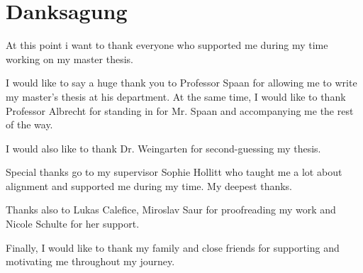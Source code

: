 \chapter*{Danksagung}

At this point i want to thank everyone who supported me during my time working
on my master thesis.

I would like to say a huge thank you to Professor Spaan for allowing me to write my master's thesis at his department. At the same time, I would like to thank Professor Albrecht for standing in for Mr. Spaan and accompanying me the rest of the way.

I would also like to thank Dr. Weingarten for second-guessing my thesis.

Special thanks go to my supervisor Sophie Hollitt who taught me a lot about alignment and supported me during my time. My deepest thanks.

Thanks also to Lukas Calefice, Miroslav Saur for proofreading my work and Nicole Schulte for her support.

Finally, I would like to thank my family and close friends for supporting and motivating me throughout my journey.

